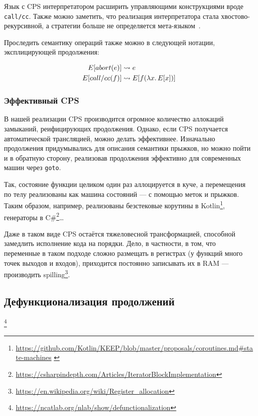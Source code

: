 Язык с CPS интерпретатором расширить управляющими конструкциями вроде \texttt{call/cc}.
Также можно заметить, что реализация интерпретатора стала хвостово-рекурсивной, а стратегии больше не определяется мета-языком~\cite{reynolds1972definitional}.


Проследить семантику операций также можно в следующей нотации, эксплицирующей продолжения:

\begin{align*}
    E[abort(e)] &\rightsquigarrow e\\
    E[call/cc(f)] &\rightsquigarrow E[f(\lambda x\ldotp E[x])]
\end{align*}

\subsubsection{Эффективный CPS}

В нашей реализации CPS производится огромное количество аллокаций замыканий, реифицирующих продолжения.
Однако, если CPS получается автоматической трансляцией, можно делать эффективнее.
Изначально продолжения придумывались для описания семантики прыжков, но можно пойти и в обратную сторону, реализовав продолжения эффективно для современных машин через \texttt{goto}.

Так, состояние функции целиком один раз аллоцируется в куче, а перемещения по телу реализованы как машина состояний --- с помощью меток и прыжков.
Таким образом, например, реализованы безстековые корутины в Kotlin\footnote{\url{https://github.com/Kotlin/KEEP/blob/master/proposals/coroutines.md\#state-machines} \label{note:kotlin-state}}, генераторы в C\#\footnote{\url{https://csharpindepth.com/Articles/IteratorBlockImplementation}}\ldots

Даже в таком виде CPS остаётся тяжеловесной трансформацией, способной замедлить исполнение кода на порядки.
Дело, в частности, в том, что переменные в таком подходе сложно размещать в регистрах (у функций много точек выходов и входов), приходится постоянно записывать их в RAM --- производить spilling\footnote{\url{https://en.wikipedia.org/wiki/Register_allocation}}.

\subsection{Дефункционализация продолжений}

\footnote{\url{https://ncatlab.org/nlab/show/defunctionalization}}

